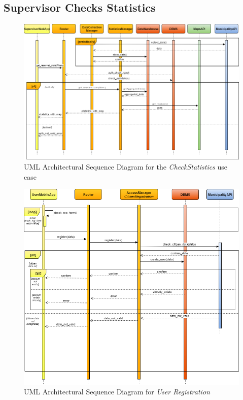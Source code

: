 \documentclass[a4paper]{report}
\begin{document}
\subsection{Supervisor Checks Statistics}
\begin{landscape}

\begin{figure}[hp]
\includegraphics[angle=0, scale=0.70]{ArchSequenceCheckStatistics}
\caption{UML Architectural Sequence Diagram for the \textit{CheckStatistics} use case}
\label{fig:seq-checkStats}
\end{figure}

\end{landscape}

\begin{figure}[hp]
\includegraphics[scale=0.7]{ArchSequenceRegistration}
\caption{UML Architectural Sequence Diagram for \textit{User Registration}}
\label{fig:seq-register}
\end{figure}
\restoregeometry
\end{document}
